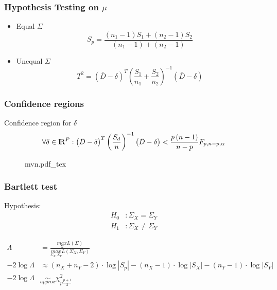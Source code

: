 \documentclass[aspectratio=169,10pt,t]{beamer}
\begin{document}
\begin{frame}[t]
	\frametitle{Hypothesis Testing on $\mu$}
	\begin{itemize}
		\item Equal $\Sigma$\\
			\[
				S_p = 
				\frac{  \left( n_1 -1  \right) S_1 +  \left( n_2 -1  \right) S_2}
				{ \left( n_1 -1  \right) +  \left( n_2 -1  \right) } 
			\] 
		\item Unequal $\Sigma$
			\[
				T^{2} =
				\left( \bar{D} - \delta  \right) ^{T}
				\left( \frac{S_1}{n_1} + \frac{S_2}{n_2}  \right) ^{-1}
				\left( \bar{D} - \delta  \right)
			\] 
	\end{itemize}
\end{frame}
\begin{frame}[t]
	\frametitle{Confidence regions}
	Confidence region for $\delta$
	\[
		\forall \delta \in {\rm I\!R}^{P}:
		\left( \bar{D} - \delta  \right) ^{T}
		\left( \frac{S_d}{n}  \right) ^{-1}
		\left( \bar{D} - \delta  \right)
		<
		\frac{p  \left( n-1 \right) }{n-p} 
		F_{p,n-p,\alpha}
	\] 
	\begin{figure}[h]
		\centering
		{mvn.pdf_tex}
	\end{figure}
\end{frame}

\begin{frame}[t]
	\frametitle{Bartlett test}
	Hypothesis:
	\[
		\begin{aligned}
			H_0 &: \Sigma_X = \Sigma_Y\\
			H_1 &: \Sigma_X \neq \Sigma_Y
		\end{aligned}
	\] 

	\[
		\begin{aligned}
			\Lambda &= \frac{
				\underset{\Sigma}{max}L \left( \Sigma \right) 
				}{
				\underset{\Sigma_X,\Sigma_Y}{max}L  \left( \Sigma_X,\Sigma_Y  \right) 
			} \\
			-2 \log  \Lambda
	&\approx
	\left( n_{X} + n_{Y} -2  \right) \cdot \log  |S_{p}| 
	-  \left( n_{X} -1  \right) \cdot \log |S_{X}|
	-  \left( n_{Y} -1  \right) \cdot \log |S_{Y}|\\
	-2 \log  \Lambda
	& \underset{approx}{\sim}
	\chi^{2}_{p \frac{p+1}{2} }
	\end{aligned}
\] 

\end{frame}
\end{document}
